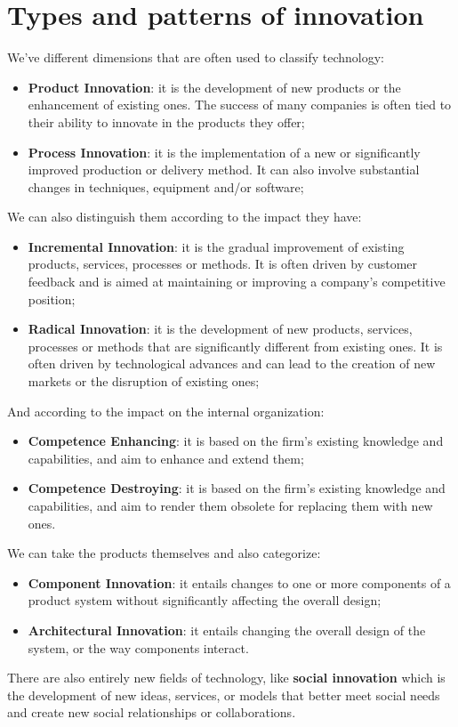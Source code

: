 \documentclass[12pt]{article}
\begin{document}
\section{Types and patterns of innovation}
We've different dimensions that are often used to classify technology:
\begin{itemize}
    \item \textbf{Product Innovation}: it is the development of new products or the enhancement of existing ones. The success of many companies is often tied to their ability to innovate in the products they offer;
    \item \textbf{Process Innovation}: it is the implementation of a new or significantly improved production or delivery method. It can also involve substantial changes in techniques, equipment and/or software;
\end{itemize}
We can also distinguish them according to the impact they have:
\begin{itemize}
    \item \textbf{Incremental Innovation}: it is the gradual improvement of existing products, services, processes or methods. It is often driven by customer feedback and is aimed at maintaining or improving a company's competitive position;
    \item \textbf{Radical Innovation}: it is the development of new products, services, processes or methods that are significantly different from existing ones. It is often driven by technological advances and can lead to the creation of new markets or the disruption of existing ones;
\end{itemize}
And according to the impact on the internal organization:
\begin{itemize}
    \item \textbf{Competence Enhancing}: it is based on the firm's existing knowledge and capabilities, and aim to enhance and extend them;
    \item \textbf{Competence Destroying}: it is based on the firm's existing knowledge and capabilities, and aim to render them obsolete for replacing them with new ones.
\end{itemize}
We can take the products themselves and also categorize:
\begin{itemize}
    \item \textbf{Component Innovation}: it entails changes to one or more components of a product system without significantly affecting the overall design;
    \item \textbf{Architectural Innovation}: it entails changing the overall design of the system, or the way components interact.
\end{itemize}
There are also entirely new fields of technology, like \textbf{social innovation} which is the development of new ideas, services, or models that better meet social needs and create new social relationships or collaborations.
\end{document}
